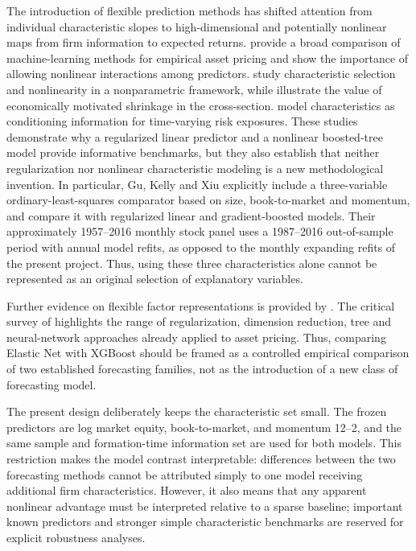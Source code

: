 The introduction of flexible prediction methods has shifted attention from
individual characteristic slopes to high-dimensional and potentially nonlinear
maps from firm information to expected returns. \cite{GuKellyXiu2020} provide
a broad comparison of machine-learning methods for empirical asset pricing and
show the importance of allowing nonlinear interactions among predictors.
\cite{FreybergerNeuhierlWeber2020} study characteristic selection and
nonlinearity in a nonparametric framework, while \cite{KozakNagelSantosh2020}
illustrate the value of economically motivated shrinkage in the cross-section.
\cite{KellyPruittSu2019} model characteristics as conditioning information
for time-varying risk exposures. These studies demonstrate why a
regularized linear predictor and a nonlinear boosted-tree model provide
informative benchmarks, but they also establish that neither regularization
nor nonlinear characteristic modeling is a new methodological invention.
In particular, Gu, Kelly and Xiu explicitly include a three-variable
ordinary-least-squares comparator based on size, book-to-market and
momentum, and compare it with regularized linear and gradient-boosted
models. Their approximately 1957--2016 monthly stock panel uses a
1987--2016 out-of-sample period with annual model refits, as opposed
to the monthly expanding refits of the present project. Thus, using
these three characteristics alone cannot be represented as an original
selection of explanatory variables.

Further evidence on flexible factor representations is provided by
\cite{ChenPelgerZhu2024}. The critical survey of
\cite{Bagnara2024} highlights the range of regularization, dimension
reduction, tree and neural-network approaches already applied to asset
pricing. Thus, comparing Elastic Net with XGBoost should be framed as a
controlled empirical comparison of two established forecasting families,
not as the introduction of a new class of forecasting model.

The present design deliberately keeps the characteristic set small.
The frozen predictors are log market equity, book-to-market, and
momentum 12--2, and the same sample and formation-time information set are
used for both models. This restriction makes the model contrast interpretable:
differences between the two forecasting methods cannot be attributed simply
to one model receiving additional firm characteristics. However, it also
means that any apparent nonlinear advantage must be interpreted relative
to a sparse baseline; important known predictors and stronger simple
characteristic benchmarks are reserved for explicit robustness analyses.

